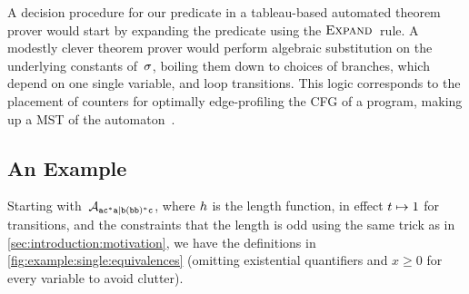 \documentclass[acmsmall,review,anonymous,screen]{acmart}\settopmatter{printfolios=true,printccs=false,printacmref=true}
\theoremstyle{definition}
\begin{document}
A decision procedure for our predicate in a tableau-based automated theorem
prover would start by expanding the predicate using the $\textsc{Expand}{}$~rule. A
modestly clever theorem prover would perform algebraic substitution on the
underlying constants of~$\operatorname{\sigma}$, boiling them down to choices of branches,
which depend on one single variable, and loop transitions. This logic
corresponds to the placement of counters for optimally edge-profiling the CFG of
a program, making up a MST of the automaton~\cite{path-profiling}.

\subsection{An Example}

Starting with~$\mathcal{A}_{\mathtt{ac^*a|b(bb)^*c}}{}$, where $h$ is the length function, in effect
$t \mapsto 1$ for transitions, and the constraints that the length is
odd using the same trick as in \cref{sec:introduction:motivation}, we have the
definitions in \cref{fig:example:single:equivalences} (omitting existential
quantifiers and $x \geq 0$ for every variable to avoid clutter).
\end{document}
